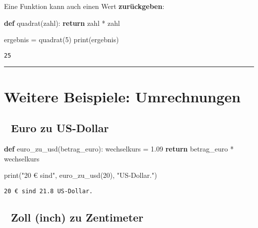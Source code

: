 \documentclass[
  letterpaper,
  DIV=11,
  numbers=noendperiod]{scrreprt}
\newenvironment{Shaded}{\begin{snugshade}}{\end{snugshade}}
\newcommand{\BuiltInTok}[1]{\textcolor[rgb]{0.00,0.23,0.31}{#1}}
\newcommand{\ControlFlowTok}[1]{\textcolor[rgb]{0.00,0.23,0.31}{\textbf{#1}}}
\newcommand{\DecValTok}[1]{\textcolor[rgb]{0.68,0.00,0.00}{#1}}
\newcommand{\FloatTok}[1]{\textcolor[rgb]{0.68,0.00,0.00}{#1}}
\newcommand{\KeywordTok}[1]{\textcolor[rgb]{0.00,0.23,0.31}{\textbf{#1}}}
\newcommand{\NormalTok}[1]{\textcolor[rgb]{0.00,0.23,0.31}{#1}}
\newcommand{\OperatorTok}[1]{\textcolor[rgb]{0.37,0.37,0.37}{#1}}
\newcommand{\StringTok}[1]{\textcolor[rgb]{0.13,0.47,0.30}{#1}}
\begin{document}
\begin{tcolorbox}
Eine Funktion kann auch einen Wert \textbf{zurückgeben}:

\begin{Shaded}
\begin{Highlighting}[]
\KeywordTok{def}\NormalTok{ quadrat(zahl):}
    \ControlFlowTok{return}\NormalTok{ zahl }\OperatorTok{*}\NormalTok{ zahl}

\NormalTok{ergebnis }\OperatorTok{=}\NormalTok{ quadrat(}\DecValTok{5}\NormalTok{)}
\BuiltInTok{print}\NormalTok{(ergebnis)}
\end{Highlighting}
\end{Shaded}

\begin{verbatim}
25
\end{verbatim}

\begin{center}\rule{0.5\linewidth}{0.5pt}\end{center}

\section{Weitere Beispiele:
Umrechnungen}\label{weitere-beispiele-umrechnungen}

\subsection{💱 Euro zu US-Dollar}\label{euro-zu-us-dollar}

\begin{Shaded}
\begin{Highlighting}[]
\KeywordTok{def}\NormalTok{ euro\_zu\_usd(betrag\_euro):}
\NormalTok{    wechselkurs }\OperatorTok{=} \FloatTok{1.09}
    \ControlFlowTok{return}\NormalTok{ betrag\_euro }\OperatorTok{*}\NormalTok{ wechselkurs}

\BuiltInTok{print}\NormalTok{(}\StringTok{"20 € sind"}\NormalTok{, euro\_zu\_usd(}\DecValTok{20}\NormalTok{), }\StringTok{"US{-}Dollar."}\NormalTok{)}
\end{Highlighting}
\end{Shaded}

\begin{verbatim}
20 € sind 21.8 US-Dollar.
\end{verbatim}

\subsection{📏 Zoll (inch) zu Zentimeter}\label{zoll-inch-zu-zentimeter}


\end{tcolorbox}
\end{document}
